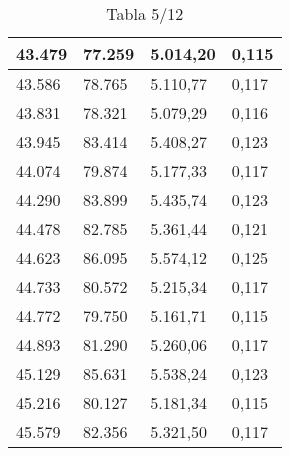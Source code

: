 \begin{table}[H]
{\begin{tabular}{| l | l | l |l |}
43.479	&	77.259	&	5.014,20	&	0,115	\\ \hline
43.586	&	78.765	&	5.110,77	&	0,117	\\ \hline
43.831	&	78.321	&	5.079,29	&	0,116	\\ \hline
43.945	&	83.414	&	5.408,27	&	0,123	\\ \hline
44.074	&	79.874	&	5.177,33	&	0,117	\\ \hline
44.290	&	83.899	&	5.435,74	&	0,123	\\ \hline
44.478	&	82.785	&	5.361,44	&	0,121	\\ \hline
44.623	&	86.095	&	5.574,12	&	0,125	\\ \hline
44.733	&	80.572	&	5.215,34	&	0,117	\\ \hline
44.772	&	79.750	&	5.161,71	&	0,115	\\ \hline
44.893	&	81.290	&	5.260,06	&	0,117	\\ \hline
45.129	&	85.631	&	5.538,24	&	0,123	\\ \hline
45.216	&	80.127	&	5.181,34	&	0,115	\\ \hline
45.579	&	82.356	&	5.321,50	&	0,117	\\ \hline
  \end{tabular}
  \caption*{Tabla 5/12}
}
\end{table}
